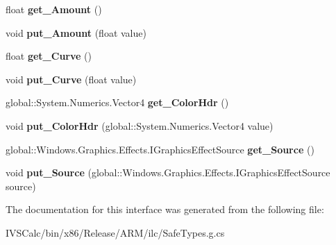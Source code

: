 \begin{DoxyCompactItemize}
float {\bfseries get\+\_\+\+Amount} ()
\item 
\mbox{\label{interface_microsoft_1_1_graphics_1_1_canvas_1_1_effects_1_1_i_vignette_effect_a1870008aff6c33d14df55efdafa89e5a}} 
void {\bfseries put\+\_\+\+Amount} (float value)
\item 
\mbox{\label{interface_microsoft_1_1_graphics_1_1_canvas_1_1_effects_1_1_i_vignette_effect_a7515b9695e0da2e84580caaca06850d6}} 
float {\bfseries get\+\_\+\+Curve} ()
\item 
\mbox{\label{interface_microsoft_1_1_graphics_1_1_canvas_1_1_effects_1_1_i_vignette_effect_a6514d64c435f93fa29dbabb96408918c}} 
void {\bfseries put\+\_\+\+Curve} (float value)
\item 
\mbox{\label{interface_microsoft_1_1_graphics_1_1_canvas_1_1_effects_1_1_i_vignette_effect_af0e049095b6661e7df4650bf921e4519}} 
global\+::\+System.\+Numerics.\+Vector4 {\bfseries get\+\_\+\+Color\+Hdr} ()
\item 
\mbox{\label{interface_microsoft_1_1_graphics_1_1_canvas_1_1_effects_1_1_i_vignette_effect_af7ab68336fa2568bdeb6a1e4594d8797}} 
void {\bfseries put\+\_\+\+Color\+Hdr} (global\+::\+System.\+Numerics.\+Vector4 value)
\item 
\mbox{\label{interface_microsoft_1_1_graphics_1_1_canvas_1_1_effects_1_1_i_vignette_effect_a83f6439e374d05019388d748dead7262}} 
global\+::\+Windows.\+Graphics.\+Effects.\+I\+Graphics\+Effect\+Source {\bfseries get\+\_\+\+Source} ()
\item 
\mbox{\label{interface_microsoft_1_1_graphics_1_1_canvas_1_1_effects_1_1_i_vignette_effect_ac5f66cc2133f986942004288fa71aaf8}} 
void {\bfseries put\+\_\+\+Source} (global\+::\+Windows.\+Graphics.\+Effects.\+I\+Graphics\+Effect\+Source source)
\end{DoxyCompactItemize}


The documentation for this interface was generated from the following file\+:\begin{DoxyCompactItemize}
\item 
I\+V\+S\+Calc/bin/x86/\+Release/\+A\+R\+M/ilc/Safe\+Types.\+g.\+cs\end{DoxyCompactItemize}
